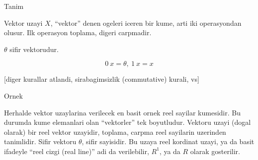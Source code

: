 \documentclass[12pt,fleqn]{article}
\begin{document}
Tanim 

Vektor uzayi $X$, ``vektor'' denen ogeleri iceren bir kume, arti iki
operasyondan olusur. Ilk operasyon toplama, digeri carpmadir. 

$\theta$ sifir vektorudur. 

\[ 0 \ x = \theta, \ 1 \ x = x \]

[diger kurallar atlandi, sirabagimsizlik (commutative) kurali, vs]

Ornek

Herhalde vektor uzaylarina verilecek en basit ornek reel sayilar
kumesidir. Bu durumda kume elemanlari olan ``vektorler'' tek
boyutludur. Vektoru uzayi (dogal olarak) bir reel vektor uzayidir, toplama,
carpma reel sayilarin uzerinden tanimlidir. Sifir vektoru $\theta$, sifir
sayisidir. Bu uzaya reel kordinat uzayi, ya da basit ifadeyle ``reel cizgi
(real line)'' adi da verilebilir, $R^1$, ya da $R$ olarak gosterilir. 
\end{document}
